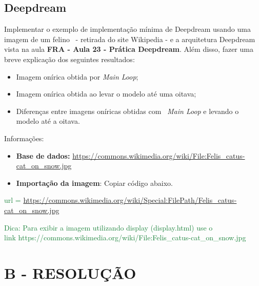 \subsection{Deepdream}


Implementar o exemplo de implementação mínima de Deepdream usando uma imagem de um felino \ {}- retirada do site
Wikipedia - e a arquitetura Deepdream vista na aula \textbf{FRA - Aula 23 - Prática Deepdream}. Além disso, fazer uma
breve explicação dos seguintes resultados: 

\begin{itemize}
\item Imagem onírica obtida por \textit{Main Loop};
\item Imagem onírica obtida ao levar o modelo até uma oitava;
\item Diferenças entre imagens oníricas obtidas com \ \textit{Main Loop }e levando o modelo até a oitava.
\end{itemize}
Informações:

\begin{itemize}[resume*=listWWNumxiii]
\item \textbf{Base de dados: }\url{https://commons.wikimedia.org/wiki/File:Felis_catus-cat_on_snow.jpg}
\end{itemize}
\begin{itemize}
\item \textbf{Importação da imagem}: Copiar código abaixo.
\end{itemize}

\foreignlanguage{english}{\textcolor[HTML]{188038}{url =
{\textquotedbl}}}\url{https://commons.wikimedia.org/wiki/Special:FilePath/Felis_catus-cat_on_snow.jpg}\foreignlanguage{english}{\textcolor[HTML]{188038}{{\textquotedbl}}}


\textcolor[HTML]{188038}{Dica: Para exibir a imagem utilizando display (display.html) use o \\link
https://commons.wikimedia.org/wiki/File:Felis\_catus-cat\_on\_snow.jpg}


\section*{\textbf{B - RESOLUÇÃO}}
\lipsum[30]